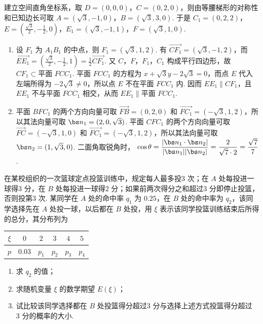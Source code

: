 \begin{solution}
建立空间直角坐标系，取 \(D=(0,0,0)\)，\(C=(0,2,0)\)，则由等腰梯形的对称性和已知边长可取 \(A=(\sqrt3,-1,0)\)，\(B=(\sqrt3,3,0)\). 于是 \(C_1=(0,2,2)\)，\(E=(\frac{\sqrt3}{2},-\frac12,0)\)，\(E_1=(\sqrt3,-1,1)\)，\(F=(\sqrt3,1,0)\).

\begin{enumerate}
\item 设 \(F_1\) 为 \(A_1B_1\) 的中点，则 \(F_1=(\sqrt3,1,2)\). 有 \(\overrightarrow{CF_1}=(\sqrt3,-1,2)\)，而 \(\overrightarrow{EE_1}=(\frac{\sqrt3}{2},-\frac12,1)=\frac12\overrightarrow{CF_1}\). 又 \(C\)，\(F\)，\(F_1\)，\(C_1\) 构成平行四边形，故 \(CF_1\subset\text{平面 }FCC_1\). 平面 \(FCC_1\) 的方程为 \(x+\sqrt3y-2\sqrt3=0\)，而点 \(E\) 代入左端所得为 \(-2\sqrt3\ne0\)，所以点 \(E\) 不在平面 \(FCC_1\) 内. 因而 \(EE_1\parallel CF_1\)，且 \(EE_1\) 不与平面 \(FCC_1\) 相交，从而 \(EE_1\parallel\text{平面 }FCC_1\).
\item 平面 \(BFC_1\) 的两个方向向量可取 \(\overrightarrow{FB}=(0,2,0)\) 和 \(\overrightarrow{FC_1}=(-\sqrt3,1,2)\)，所以其法向量可取 \(\bs n_1=(2,0,\sqrt3)\). 平面 \(CFC_1\) 的两个方向向量可取 \(\overrightarrow{FC}=(-\sqrt3,1,0)\) 和 \(\overrightarrow{FC_1}=(-\sqrt3,1,2)\)，所以其法向量可取 \(\bs n_2=(1,\sqrt3,0)\). 二面角取锐角时，
\(\displaystyle \cos\theta=\frac{|\bs n_1\cdot\bs n_2|}{|\bs n_1||\bs n_2|}=\frac{2}{\sqrt7\cdot2}=\frac{\sqrt7}{7}\).
\end{enumerate}
\end{solution}

\begin{problem}
在某校组织的一次篮球定点投篮训练中，规定每人最多投\(3\text{ 次}\)；在 \(A\) 处每投进一球得\(3\text{ 分}\)，在 \(B\) 处每投进一球得\(2\text{ 分}\)；如果前两次得分之和超过\(3\text{ 分}\)即停止投篮，否则投第\(3\text{ 次}\). 某同学在 \(A\) 处的命中率 \(q_1\) 为 \(0.25\)，在 \(B\) 处的命中率为 \(q_2\)，该同学选择先在 \(A\) 处投一球，以后都在 \(B\) 处投，用 \(\xi\) 表示该同学投篮训练结束后所得的总分，其分布列为

\begin{center}
\begin{tabular}{c|ccccc}
\(\xi\) & \(0\) & \(2\) & \(3\) & \(4\) & \(5\) \\
\hline
\(p\) & \(0.03\) & \(p_1\) & \(p_2\) & \(p_3\) & \(p_4\)
\end{tabular}
\end{center}

\begin{enumerate}
\item 求 \(q_2\) 的值；
\item 求随机变量 \(\xi\) 的数学期望 \(E(\xi)\)；
\item 试比较该同学选择都在 \(B\) 处投篮得分超过\(3\text{ 分}\)与选择上述方式投篮得分超过\(3\text{ 分}\)的概率的大小.
\end{enumerate}
\end{problem}

